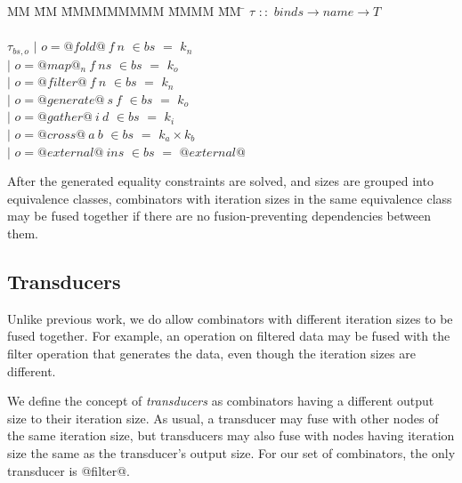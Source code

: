 \begin{tabbing}
MM \= MM \= MMMMMMMMM \= MMMM \= MM \= \kill
$\tau$  \>$::$\> $binds \rightarrow name \rightarrow T$ \\
\\
$\tau_{bs,o}$    
            \> $|$ \> $o = @fold@~f~n$      \> $\in bs$ \> $=$ \> $k_n$ \\
            \> $|$ \> $o = @map@_n~f~ns$    \> $\in bs$ \> $=$ \> $k_o$ \\
            \> $|$ \> $o = @filter@~f~n$    \> $\in bs$ \> $=$ \> $k_n$ \\
            \> $|$ \> $o = @generate@~s~f$  \> $\in bs$ \> $=$ \> $k_o$ \\
            \> $|$ \> $o = @gather@~i~d$    \> $\in bs$ \> $=$ \> $k_i$ \\
            \> $|$ \> $o = @cross@~a~b$     \> $\in bs$ \> $=$ \> $k_a \times k_b$ \\
            \> $|$ \> $o = @external@~ins$  \> $\in bs$ \> $=$ \> $@external@$ \\
\end{tabbing}

After the generated equality constraints are solved, and sizes are grouped into equivalence classes, combinators with iteration sizes in the same equivalence class may be fused together if there are no fusion-preventing dependencies between them.


\subsection{Transducers}
Unlike previous work, we do allow combinators with different iteration sizes to be fused together.
For example, an operation on filtered data may be fused with the filter operation that generates the data, even though the iteration sizes are different.

We define the concept of \emph{transducers} as combinators having a different output size to their iteration size.
As usual, a transducer may fuse with other nodes of the same iteration size, but transducers may also fuse with nodes having iteration size the same as the transducer's output size.
For our set of combinators, the only transducer is @filter@.

